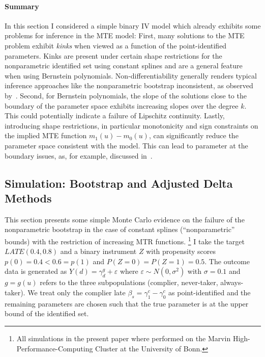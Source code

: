 \documentclass[12pt,a4paper,english]{article} %
\numberwithin{equation}{section}
\theoremstyle{definition}
\theoremstyle{remark}
\theoremstyle{plain}
\begin{document}
\paragraph{Summary}
In this section I considered a simple binary IV model which already exhibits some problems for inference in the MTE model:
First, many solutions to the MTE problem exhibit \textit{kinks} when viewed as a function of the point-identified parameters.
Kinks are present under certain shape restrictions for the nonparametric identified set using constant splines and are a general feature when using Bernstein polynomials.
Non-differentiability generally renders typical inference approaches like the nonparametric bootstrap inconsistent, as observed by~\cite{dumbgen1993nondifferentiable}.
Second, for Bernstein polynomials, the slope of the solutions close to the boundary of the parameter space exhibits increasing slopes over the degree $k$.
This could potentially indicate a failure of Lipschitz continuity.
Lastly, introducing shape restrictions, in particular monotonicity and sign constraints on the implied MTE function $m_1(u) - m_0(u)$, can significantly reduce the parameter space consistent with the model.
This can lead to parameter at the boundary issues, as, for example, discussed in~\cite{andrews1999estimation}.


\subsection{Simulation: Bootstrap and Adjusted Delta Methods}
This section presents some simple Monte Carlo evidence on the failure of the nonparametric bootstrap in the case of constant splines (``nonparametric'' bounds) with the restriction of increasing MTR functions.
\footnote{All simulations in the present paper where performed on the Marvin High-Performance-Computing Cluster at the University of Bonn.}
I take the target $LATE(0.4, 0.8)$ and a binary instrument $Z$ with propensity scores $p(0) = 0.4 < 0.6 = p(1)$ and $P(Z=0)=P(Z=1)=0.5$.
The outcome data is generated as $Y(d) = \gamma_d^g + \varepsilon$ where $\varepsilon \sim N(0,\sigma^2)$ with $\sigma=0.1$ and $g=g(u)$ refers to the three subpopulations (complier, never-taker, always-taker).
We treat only the complier late $\beta_s = \gamma_1^c - \gamma_0^c$ as point-identified and the remaining parameters are chosen such that the true parameter is at the upper bound of the identified set.
\end{document}
